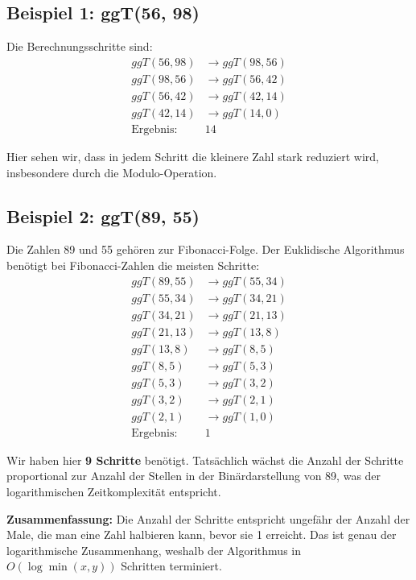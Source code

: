 \documentclass[a4paper,12pt]{article}
\begin{document}
	\subsection*{Beispiel 1: ggT(56, 98)}
	
	Die Berechnungsschritte sind:
	\begin{align*}
		ggT(56, 98) &\to ggT(98, 56) \\
		ggT(98, 56) &\to ggT(56, 42) \\
		ggT(56, 42) &\to ggT(42, 14) \\
		ggT(42, 14) &\to ggT(14, 0) \\
		\text{Ergebnis: } &14
	\end{align*}
	
	Hier sehen wir, dass in jedem Schritt die kleinere Zahl stark reduziert wird, insbesondere durch die Modulo-Operation.
	
	\subsection*{Beispiel 2: ggT(89, 55)}
	
	Die Zahlen 89 und 55 gehören zur Fibonacci-Folge. Der Euklidische Algorithmus benötigt bei Fibonacci-Zahlen die meisten Schritte:
	\begin{align*}
		ggT(89, 55) &\to ggT(55, 34) \\
		ggT(55, 34) &\to ggT(34, 21) \\
		ggT(34, 21) &\to ggT(21, 13) \\
		ggT(21, 13) &\to ggT(13, 8) \\
		ggT(13, 8) &\to ggT(8, 5) \\
		ggT(8, 5) &\to ggT(5, 3) \\
		ggT(5, 3) &\to ggT(3, 2) \\
		ggT(3, 2) &\to ggT(2, 1) \\
		ggT(2, 1) &\to ggT(1, 0) \\
		\text{Ergebnis: } &1
	\end{align*}
	
	Wir haben hier \textbf{9 Schritte} benötigt. Tatsächlich wächst die Anzahl der Schritte proportional zur Anzahl der Stellen in der Binärdarstellung von 89, was der logarithmischen Zeitkomplexität entspricht.
	
	\textbf{Zusammenfassung:} Die Anzahl der Schritte entspricht ungefähr der Anzahl der Male, die man eine Zahl halbieren kann, bevor sie 1 erreicht. Das ist genau der logarithmische Zusammenhang, weshalb der Algorithmus in \( O(\log \min(x, y)) \) Schritten terminiert.
\end{document}
